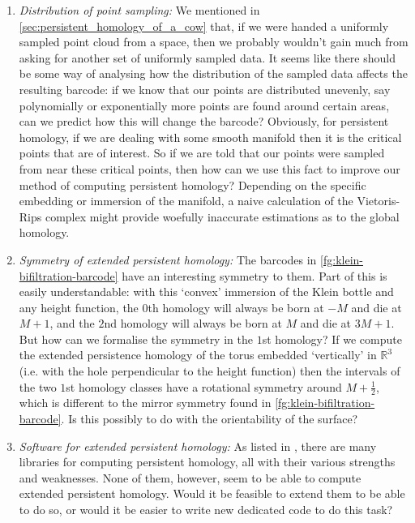 \documentclass[12pt]{article}
\numberwithin{equation}{subsection}
\numberwithin{theorem}{subsection}
\numberwithin{lemma}{subsection}
\numberwithin{corollary}{subsection}
\numberwithin{definition}{subsection}
\numberwithin{example}{subsection}
\numberwithin{note}{subsection}
\newcommand{\rr}{\mathbb{R}}
\begin{document}
        \begin{enumerate}
            \item \emph{Distribution of point sampling:} We mentioned in \cref{sec:persistent_homology_of_a_cow} that, if we were handed a uniformly sampled point cloud from a space, then we probably wouldn't gain much from asking for another set of uniformly sampled data.
                It seems like there should be some way of analysing how the distribution of the sampled data  affects the resulting barcode: if we know that our points are distributed unevenly, say polynomially or exponentially more points are found around certain areas, can we predict how this will change the barcode?
                Obviously, for persistent homology, if we are dealing with some smooth manifold then it is the critical points that are of interest.
                So if we are told that our points were sampled from near these critical points, then how can we use this fact to improve our method of computing persistent homology?
                Depending on the specific embedding or immersion of the manifold, a naive calculation of the Vietoris-Rips complex might provide woefully inaccurate estimations as to the global homology.
            \item \emph{Symmetry of extended persistent homology:} The barcodes in \cref{fg:klein-bifiltration-barcode} have an interesting symmetry to them.
                Part of this is easily understandable: with this `convex' immersion of the Klein bottle and any height function, the $0$th homology will always be born at $-M$ and die at $M+1$, and the $2$nd homology will always be born at $M$ and die at $3M+1$.
                But how can we formalise the symmetry in the $1$st homology?
                If we compute the extended persistence homology of the torus embedded `vertically' in $\rr^3$ (i.e. with the hole perpendicular to the height function) then the intervals of the two $1$st homology classes have a rotational symmetry around $M+\frac12$, which is different to the mirror symmetry found in \cref{fg:klein-bifiltration-barcode}.
                Is this possibly to do with the orientability of the surface?
            \item \emph{Software for extended persistent homology:} As listed in \cite{Otter:2015wi}, there are many libraries for computing persistent homology, all with their various strengths and weaknesses.
                None of them, however, seem to be able to compute extended persistent homology.
                Would it be feasible to extend them to be able to do so, or would it be easier to write new dedicated code to do this task?

\end{enumerate}
\end{document}
